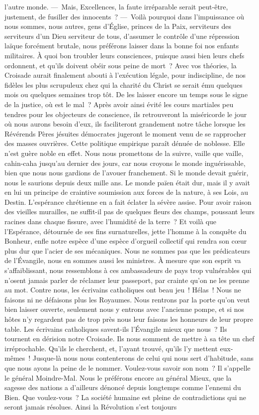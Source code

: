 \documentclass[french,twoside]{book} %
\begin{document}
l’autre monde. — Mais, Excellences, la faute irréparable serait peut-être, justement, de fusiller des innocents ? — Voilà pourquoi dans l’impuissance où nous sommes, nous autres, gens d’Église, princes de la Paix, serviteurs des serviteurs d’un Dieu serviteur de tous, d’assumer le contrôle d’une répression laïque forcément brutale, nous préférons laisser dans la bonne foi nos enfants militaires. À quoi bon troubler leurs consciences, puisque aussi bien leurs chefs ordonnent, et qu’ils doivent obéir sous peine de mort ? Avec vos théories, la Croisade aurait finalement abouti à l’exécution légale, pour indiscipline, de nos fidèles les plus scrupuleux chez qui la charité du Christ se serait ému quelques mois ou quelques semaines trop tôt. De les laisser encore un temps sous le signe de la justice, où est le mal ? Après avoir ainsi évité les cours martiales peu tendres pour les objecteurs de conscience, ils retrouveront la miséricorde le jour où nous aurons besoin d’eux, ils faciliteront grandement notre tâche lorsque les Révérends Pères jésuites démocrates jugeront le moment venu de se rapprocher des masses ouvrières. Cette politique empirique paraît dénuée de noblesse. Elle n’est guère noble en effet. Nous nous promettons de la suivre, vaille que vaille, cahin-caha jusqu’au dernier des jours, car nous croyons le monde inguérissable, bien que nous nous gardions de l’avouer franchement. Si le monde devait guérir, nous le saurions depuis deux mille ans. Le monde païen était dur, mais il y avait en lui un principe de craintive soumission aux forces de la nature, à ses Lois, au Destin. L’espérance chrétienne en a fait éclater la sévère assise. Pour avoir raison des vieilles murailles, ne suffit-il pas de quelques fleurs des champs, poussant leurs racines dans chaque fissure, avec l’humidité de la terre ? Et voilà que l’Espérance, détournée de ses fins surnaturelles, jette l’homme à la conquête du Bonheur, enfle notre espèce d’une espèce d’orgueil collectif qui rendra son cœur plus dur que l’acier de ses mécaniques. Nous ne sommes pas que les prédicateurs de l’Évangile, nous en sommes aussi les ministres. À mesure que son esprit va s’affaiblissant, nous ressemblons à ces ambassadeurs de pays trop vulnérables qui n’osent jamais parler de réclamer leur passeport, par crainte qu’on ne les prenne au mot. Contre nous, les écrivains catholiques ont beau jeu ! Hélas ! Nous ne faisons ni ne défaisons plus les Royaumes. Nous rentrons par la porte qu’on veut bien laisser ouverte, seulement nous y entrons avec l’ancienne pompe, et si nos hôtes n’y regardent pas de trop près nous leur faisons les honneurs de leur propre table. Les écrivains catholiques savent-ils l’Évangile mieux que nous ? Ils tournent en dérision notre Croisade. Ils nous somment de mettre à sa tête un chef irréprochable. Qu’ils le cherchent, et, l’ayant trouvé, qu’ils l’y mettent eux-mêmes ! Jusque-là nous nous contenterons de celui qui nous sert d’habitude, sans que nous ayons la peine de le nommer. Voulez-vous savoir son nom ? Il s’appelle le général Moindre-Mal. Nous le préférons encore au général Mieux, que la sagesse des nations a d’ailleurs dénoncé depuis longtemps comme l’ennemi du Bien. Que voulez-vous ? La société humaine est pleine de contradictions qui ne seront jamais résolues. Ainsi la Révolution s’est toujours 
\end{document}
